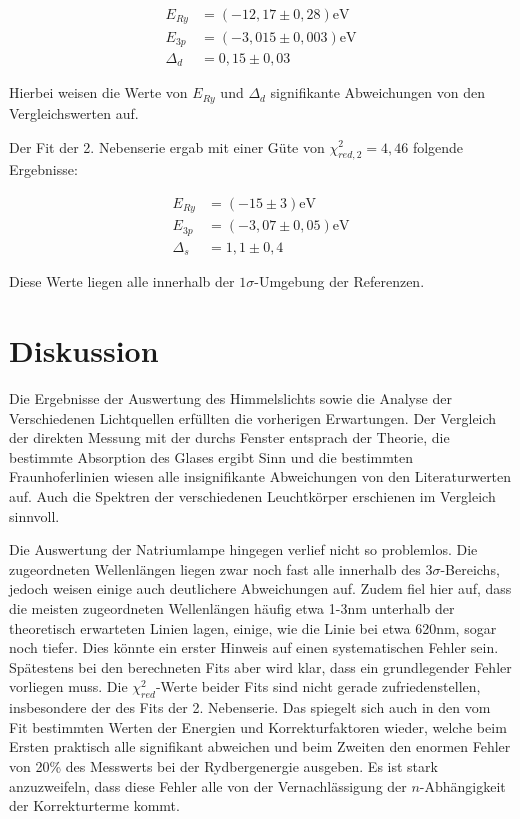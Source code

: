 \documentclass{article}
\begin{document}
\begin{equation}
    \begin{split}
        E_{Ry} &= (-12,17 \pm 0,28) \text{eV} \\
        E_{3p} &= (-3,015 \pm 0,003) \text{eV} \\
        \Delta_d &= 0,15 \pm 0,03
    \end{split}
\end{equation}

Hierbei weisen die Werte von $E_{Ry}$ und $\Delta_d$ signifikante Abweichungen von den Vergleichswerten auf.

Der Fit der 2. Nebenserie ergab mit einer Güte von $\chi^2_{red,2} = 4,46$ folgende Ergebnisse:

\begin{equation}
    \begin{split}
        E_{Ry} &= (-15 \pm 3) \text{eV} \\
        E_{3p} &= (-3,07 \pm 0,05) \text{eV} \\
        \Delta_s &= 1,1 \pm 0,4
    \end{split}
\end{equation}

Diese Werte liegen alle innerhalb der $1\sigma$-Umgebung der Referenzen.

\newpage
\section{Diskussion}

Die Ergebnisse der Auswertung des Himmelslichts sowie die Analyse der Verschiedenen Lichtquellen erfüllten die vorherigen Erwartungen. Der Vergleich der direkten Messung mit der durchs Fenster entsprach der Theorie, die bestimmte Absorption des Glases ergibt Sinn und die bestimmten Fraunhoferlinien wiesen alle insignifikante Abweichungen von den Literaturwerten auf. Auch die Spektren der verschiedenen Leuchtkörper erschienen im Vergleich sinnvoll.

Die Auswertung der Natriumlampe hingegen verlief nicht so problemlos. Die zugeordneten Wellenlängen liegen zwar noch fast alle innerhalb des $3\sigma$-Bereichs, jedoch weisen einige auch deutlichere Abweichungen auf. Zudem fiel hier auf, dass die meisten zugeordneten Wellenlängen häufig etwa 1-3nm unterhalb der theoretisch erwarteten Linien lagen, einige, wie die Linie bei etwa 620nm, sogar noch tiefer. Dies könnte ein erster Hinweis auf einen systematischen Fehler sein. Spätestens bei den berechneten Fits aber wird klar, dass ein grundlegender Fehler vorliegen muss. Die $\chi^2_{red}$-Werte beider Fits sind nicht gerade zufriedenstellen, insbesondere der des Fits der 2. Nebenserie. Das spiegelt sich auch in den vom Fit bestimmten Werten der Energien und Korrekturfaktoren wieder, welche beim Ersten praktisch alle signifikant abweichen und beim Zweiten den enormen Fehler von 20\% des Messwerts bei der Rydbergenergie ausgeben. Es ist stark anzuzweifeln, dass diese Fehler alle von der Vernachlässigung der $n$-Abhängigkeit der Korrekturterme kommt.
\end{document}
